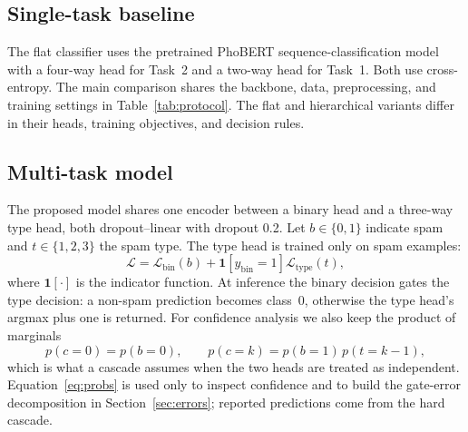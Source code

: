 \documentclass[12pt,a4paper]{article}
\begin{document}
\subsection{Single-task baseline}
The flat classifier uses the pretrained PhoBERT sequence-classification model with a four-way head for Task~2 and a two-way head for Task~1. Both use cross-entropy. The main comparison shares the backbone, data, preprocessing, and training settings in Table~\ref{tab:protocol}. The flat and hierarchical variants differ in their heads, training objectives, and decision rules.

\subsection{Multi-task model}
The proposed model shares one encoder between a binary head and a three-way type head, both dropout--linear with dropout 0.2. Let $b\in\{0,1\}$ indicate spam and $t\in\{1,2,3\}$ the spam type. The type head is trained only on spam examples:
\begin{equation}
\mathcal{L} = \mathcal{L}_{\mathrm{bin}}(b) + \mathbf{1}\!\left[y_{\mathrm{bin}}=1\right]\mathcal{L}_{\mathrm{type}}(t),
\label{eq:loss}
\end{equation}
where $\mathbf{1}[\cdot]$ is the indicator function.
At inference the binary decision gates the type decision: a non-spam prediction becomes class~0, otherwise the type head's argmax plus one is returned. For confidence analysis we also keep the product of marginals
\begin{equation}
p(c{=}0)=p(b{=}0),\qquad p(c{=}k)=p(b{=}1)\,p(t{=}k-1),
\label{eq:probs}
\end{equation}
which is what a cascade assumes when the two heads are treated as independent. Equation~\eqref{eq:probs} is used only to inspect confidence and to build the gate-error decomposition in Section~\ref{sec:errors}; reported predictions come from the hard cascade.
\end{document}
